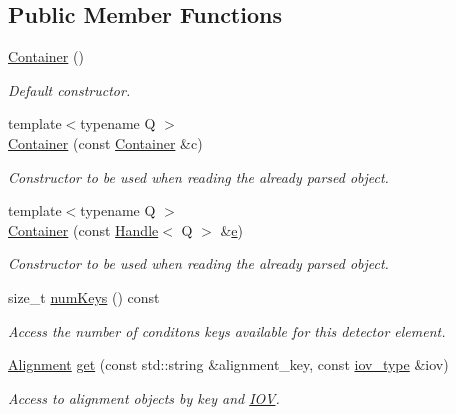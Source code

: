 \subsection*{Public Member Functions}
\begin{DoxyCompactItemize}
\item 
\hyperlink{class_d_d4hep_1_1_alignments_1_1_container_a17cf12ead74ea2c6359818a3b54668af}{Container} ()
\begin{DoxyCompactList}\small\item\em Default constructor. \end{DoxyCompactList}\item 
{\footnotesize template$<$typename Q $>$ }\\\hyperlink{class_d_d4hep_1_1_alignments_1_1_container_adecc9202a1c2d2eb7f4048d441000d17}{Container} (const \hyperlink{class_d_d4hep_1_1_alignments_1_1_container}{Container} \&c)
\begin{DoxyCompactList}\small\item\em Constructor to be used when reading the already parsed object. \end{DoxyCompactList}\item 
{\footnotesize template$<$typename Q $>$ }\\\hyperlink{class_d_d4hep_1_1_alignments_1_1_container_a7225fa99b3090f49b485910e82d9484a}{Container} (const \hyperlink{class_d_d4hep_1_1_handle}{Handle}$<$ Q $>$ \&\hyperlink{_volumes_8cpp_a8a9a1f93e9b09afccaec215310e64142}{e})
\begin{DoxyCompactList}\small\item\em Constructor to be used when reading the already parsed object. \end{DoxyCompactList}\item 
size\+\_\+t \hyperlink{class_d_d4hep_1_1_alignments_1_1_container_a95b375e1bc0e962b8e226467f6b39221}{num\+Keys} () const
\begin{DoxyCompactList}\small\item\em Access the number of conditons keys available for this detector element. \end{DoxyCompactList}\item 
\hyperlink{class_d_d4hep_1_1_alignments_1_1_alignment}{Alignment} \hyperlink{class_d_d4hep_1_1_alignments_1_1_container_a35cc0038316885f30fb1cf68c234ef41}{get} (const std\+::string \&alignment\+\_\+key, const \hyperlink{class_d_d4hep_1_1_alignments_1_1_container_a0da2fec1e4433deea86defda82886128}{iov\+\_\+type} \&iov)
\begin{DoxyCompactList}\small\item\em Access to alignment objects by key and \hyperlink{class_d_d4hep_1_1_i_o_v}{I\+OV}. \end{DoxyCompactList}\item 

\end{DoxyCompactItemize}
